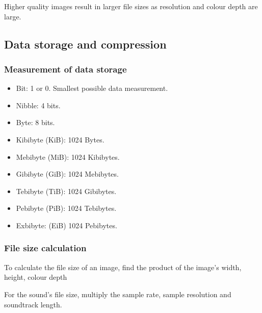 \documentclass[twocolumn]{article}
\begin{document}
Higher quality images result in larger file sizes as resolution and colour depth are 
large.

\subsection{Data storage and compression}
\subsubsection{Measurement of data storage}
\begin{itemize}
	\item Bit: 1 or 0. Smallest possible data measurement.
	\item Nibble: 4 bits.
	\item Byte: 8 bits.
	\item Kibibyte (KiB): 1024 Bytes.
	\item Mebibyte (MiB): 1024 Kibibytes.
	\item Gibibyte (GiB): 1024 Mebibytes.
	\item Tebibyte (TiB): 1024 Gibibytes.
	\item Pebibyte (PiB): 1024 Tebibytes.
	\item Exbibyte: (EiB) 1024 Pebibytes.
\end{itemize}

\subsubsection{File size calculation}
To calculate the file size of an image, find the product of the image's width, height, 
colour depth

For the sound's file size, multiply the sample rate, sample resolution and soundtrack
length.
\end{document}
